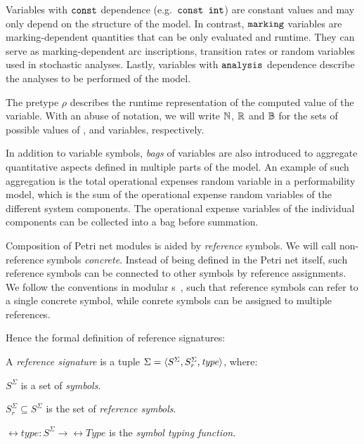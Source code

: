 Variables with \(\texttt{\upshape const}\) dependence (e.g.~\(\texttt{\upshape const int}\)) are constant values and may only depend on the structure of the model. In contrast, \(\texttt{\upshape marking}\) variables are marking-dependent quantities that can be only evaluated and runtime. They can serve as marking-dependent arc inscriptions, transition rates or random variables used in stochastic analyses. Lastly, variables with \(\texttt{\upshape analysis}\) dependence describe the analyses to be performed of the model.

The pretype \(\rho\) describes the runtime representation of the computed value of the variable. With an abuse of notation, we will write \(\mathbb{N}\), \(\mathbb{R}\) and \(\mathbb{B}\) for the sets of possible values of ,  and  variables, respectively.

In addition to variable symbols, \emph{bags} of variables are also introduced to aggregate quantitative aspects defined in multiple parts of the model. An example of such aggregation is the total operational expenses random variable in a performability model, which is the sum of the operational expense random variables of the different system components. The operational expense variables of the individual components can be collected into a bag before summation.

Composition of Petri net modules is aided by \emph{reference} symbols. We will call non-reference symbols \emph{concrete}. Instead of being defined in the Petri net itself, such reference symbols can be connected to other symbols by reference assignments. We follow the conventions in modular s~\citep{Kindler01modular}, such that reference symbols can refer to a single concrete symbol, while conrete symbols can be assigned to multiple references.

Hence the formal definition of reference  signatures:

\begin{dfn}
  A \emph{reference   signature} is a tuple \(\Sigma = \langle S^\Sigma, S_r^\Sigma, \textrm{\itshape type\/} \rangle\), where:
  \begin{compactitem}
  \item \(S^\Sigma\) is a set of \emph{symbols}.
  \item \(S_r^\Sigma \subseteq S^\Sigma\) is the set of \emph{reference symbols}.
  \item \(\rel{type}\colon S^\Sigma \to \rel{Type}\) is the \emph{symbol typing function}.
  \end{compactitem}
\end{dfn}

